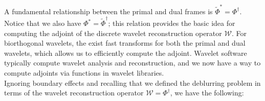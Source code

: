 \documentclass[journal]{IEEEtran}
\begin{document}
%
%
%
%
%
%
%

   \noindent A fundamental relationship between the primal and dual frames is $\tilde{\Phi}^\ast = \Phi^\dagger$.  Notice that we also have $\Phi^\ast = \tilde{\Phi}^\dagger$; this relation provides the basic idea for computing the adjoint of the discrete wavelet reconstruction operator $\mathcal{W}$.  For biorthogonal wavelets, the exist fast transforms for both the primal and dual wavelets, which allows us to efficiently compute the adjoint.  Wavelet software typically compute wavelet analysis and reconstruction, and we now have a way to compute adjoints via functions in wavelet libraries.\\
  
   Ignoring boundary effects and recalling that we defined the deblurring problem in terms of the wavelet reconstruction operator $\mathcal{W}=\Phi^\dagger$, we have the following:
\end{document}
